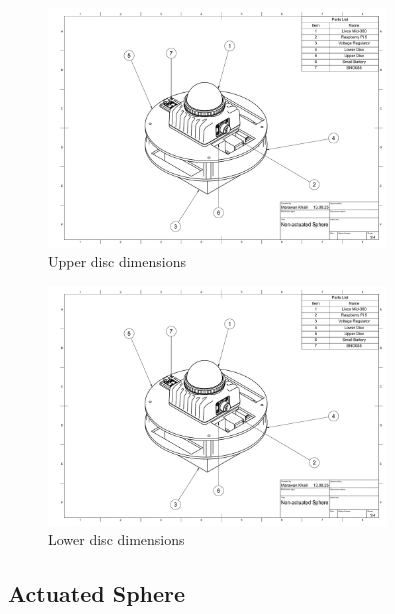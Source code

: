 \documentclass[english, bachelor, utf8]{base/thesis_telematics}
\begin{document}
\begin{figure}[H]
\centering
\includegraphics[width=0.80\textwidth,page=3]{pics/Non_actuated_Sphere_drawing.pdf}
\caption{Upper disc dimensions}
\label{fig:system_page3}
\end{figure}

\begin{figure}[H]
\centering
\includegraphics[width=0.80\textwidth,page=4]{pics/Non_actuated_Sphere_drawing.pdf}
\caption{Lower disc dimensions}
\label{fig:system_page4}
\end{figure}

\clearpage %

\subsection{Actuated Sphere}
\label{sec:actuated-sphere-drawings}
\clearpage %
\end{document}
